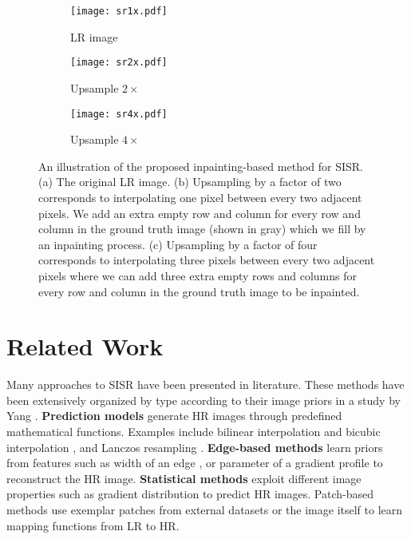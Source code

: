 \documentclass[10pt,twocolumn,letterpaper]{article}
\begin{document}
\begin{figure}[h]
	\centering
	\begin{subfigure}{.14\textwidth}
		\centering
		\texttt{[image: sr1x.pdf]}
		\caption{LR image}
	\end{subfigure}
	\begin{subfigure}{.14\textwidth}
		\centering
		\texttt{[image: sr2x.pdf]}
		\caption{Upsample $2 \times$}
	\end{subfigure}
	\begin{subfigure}{.14\textwidth}
		\centering
		\texttt{[image: sr4x.pdf]}
		\caption{Upsample $4 \times$}
	\end{subfigure}
	\caption{An illustration of the proposed inpainting-based method for SISR. (a) The original LR image. (b) Upsampling by a factor of two corresponds to interpolating one pixel between every two adjacent pixels. We add an extra empty row and column for every row and column in the ground truth image (shown in gray) which we fill by an inpainting process. (c) Upsampling by a factor of four corresponds to interpolating three pixels between every two adjacent pixels where we can add three extra empty rows and columns for every row and column in the ground truth image to be inpainted.}
	\label{fig:sr_inpainting}
\end{figure}

\section{Related Work}
Many approaches to SISR have been presented in literature. These methods have been extensively organized by type according to their image priors in a study by Yang \etal \cite{yang2014single}. \textbf{Prediction models} generate HR images through predefined mathematical functions. Examples include bilinear interpolation and bicubic interpolation \cite{de1978practical}, and Lanczos resampling \cite{duchon1979lanczos}. \textbf{Edge-based methods} learn priors from features such as width of an edge \cite{fattal2007image}, or parameter of a gradient profile \cite{sun2008image} to reconstruct the HR image. \textbf{Statistical methods} exploit different image properties such as gradient distribution \cite{shan2008fast} to predict HR images. Patch-based methods use exemplar patches from external datasets \cite{chang2004super,freeman2002example} or the image itself \cite{irani2009super,freedman2011image} to learn mapping functions from LR to HR.
\end{document}
